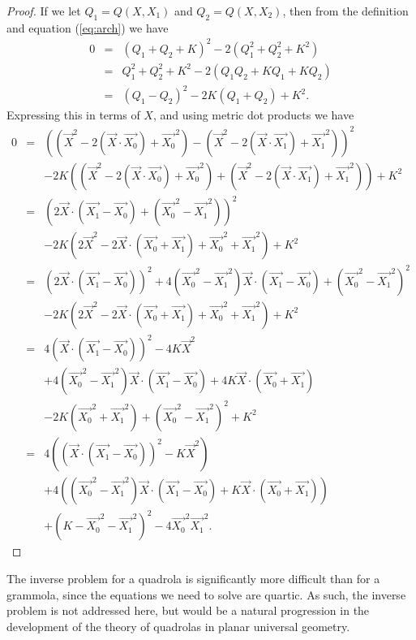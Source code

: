 \begin{proof} 
If we let $Q_1 = Q(X, X_1)$ and $Q_2 = Q(X, X_2)$, then from the definition and equation (\ref{eq:arch}) we have
\begin{eqnarray*}
0 & = & (Q_1 + Q_2 + K)^2 - 2(Q_1^2 + Q_2^2 + K^2)\nonumber\\
  & = & Q_1^2 + Q_2^2 + K^2 - 2(Q_1Q_2 + KQ_1 + KQ_2)\nonumber\\
  & = & (Q_1 - Q_2)^2 - 2K(Q_1 + Q_2) + K^2.\nonumber
\end{eqnarray*}
Expressing this in terms of $X$, and using metric dot products we have
\begin{eqnarray}
0  & = & \left(\left(\vec{X}^2 - 2(\vec{X}\cdot\vec{X_0}) + \vec{X_0}^2\right) - \left(\vec{X}^2 - 2(\vec{X}\cdot \vec{X_1}) + \vec{X_1}^2\right)\right)^2 \nonumber\\
  &   & - 2K\left(\left(\vec{X}^2 - 2(\vec{X}\cdot \vec{X_0}) + \vec{X_0}^2\right) + \left(\vec{X}^2 - 2(\vec{X}\cdot \vec{X_1}) + \vec{X_1}^2\right)\right) + K^2\nonumber\\
  & = & \left(2\vec{X}\cdot(\vec{X_1} - \vec{X_0}) + (\vec{X_0}^2 - \vec{X_1}^2)\right)^2 \nonumber\\
  &   & - 2K\left(2\vec{X}^2 - 2\vec{X}\cdot (\vec{X_0} + \vec{X_1}) + \vec{X_0}^2 + \vec{X_1}^2\right) + K^2\nonumber\\
  & = & \left(2\vec{X}\cdot(\vec{X_1} - \vec{X_0})\right)^2 + 4(\vec{X_0}^2 - \vec{X_1}^2)\vec{X}\cdot(\vec{X_1} - \vec{X_0}) + \left(\vec{X_0}^2 - \vec{X_1}^2\right)^2\nonumber\\
  &   & - 2K\left(2\vec{X}^2 - 2\vec{X}\cdot (\vec{X_0} + \vec{X_1}) + \vec{X_0}^2 + \vec{X_1}^2\right) + K^2\nonumber\\
  & = & 4\left(\vec{X}\cdot(\vec{X_1} - \vec{X_0})\right)^2 -4K\vec{X}^2\nonumber\\
  &   &  + 4(\vec{X_0}^2 - \vec{X_1}^2)\vec{X}\cdot(\vec{X_1} - \vec{X_0}) + 4K\vec{X}\cdot (\vec{X_0} + \vec{X_1})\nonumber\\
  &   &  - 2K(\vec{X_0}^2 + \vec{X_1}^2) + \left(\vec{X_0}^2 - \vec{X_1}^2\right)^2 + K^2\nonumber\\
  & = & 4\left(\left(\vec{X}\cdot(\vec{X_1} - \vec{X_0})\right)^2 -K\vec{X}^2\right)\nonumber\\
  &   &  + 4\left((\vec{X_0}^2 - \vec{X_1}^2)\vec{X}\cdot(\vec{X_1} - \vec{X_0}) + K\vec{X}\cdot (\vec{X_0} + \vec{X_1})\right)\nonumber\\
  &   &  + \left(K - \vec{X_0}^2 - \vec{X_1}^2\right)^2 - 4\vec{X_0}^2\vec{X_1}^2.\nonumber
\end{eqnarray}
\end{proof}

The inverse problem for a quadrola is significantly more difficult than for a grammola, since the equations we need to solve are quartic.
As such, the inverse problem is not addressed here, but would be a natural progression in the development of the theory of quadrolas in planar universal geometry.
